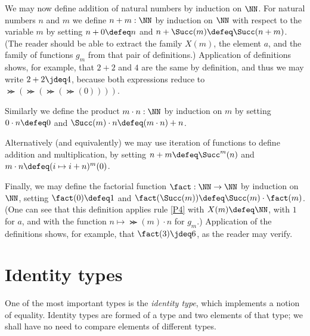 We may now define addition of natural numbers by induction on $\NN$.  For natural numbers $n$ and $m$ we define $n+m : \NN$ by induction on
$\NN$ with respect to the variable $m$ by setting $n+0\defeq n$ and $n+\Succ(m)\defeq \Succ(n+m)$.  (The reader should be able to extract the
family $X(m)$, the element $a$, and the family of functions $g_m$ from that pair of definitions.)  Application of definitions shows, for
example, that $2+2$ and $4$ are the same by definition, and thus we may write $2+2 \jdeq 4$, because both expressions reduce to
$\Succ(\Succ(\Succ(\Succ(0))))$.

Similarly we define the product $m \cdot n : \NN$ by induction on $m$ by setting $ 0 \cdot n \defeq 0$ and
$ \Succ(m) \cdot n \defeq (m \cdot n) + n$.

Alternatively (and equivalently) we may use iteration of functions to define addition and multiplication, by setting $n+m \defeq \Succ^m(n)$ and
$m \cdot n \defeq ( i \mapsto i + n )^m (0) $.

Finally, we may define the factorial function%
$\fact : \NN \to \NN$ by induction on $\NN$, setting $\fact(0) \defeq 1$ and
$\fact(\Succ(m)) \defeq \Succ(m) \cdot \fact(m)$.  (One can see that this definition applies rule \ref{P4} with $X(m) \defeq \NN$, with $1$ for
$a$, and with the function $n \mapsto \Succ(m) \cdot n$ for $g_m$.)  Application of the definitions shows, for example, that $\fact(3) \jdeq 6$, as
the reader may verify.

\section{Identity types}
\label{sec:identity-types}

One of the most important types is the \emph{identity type},
which implements a notion of equality.
Identity types are formed of a type and two elements of that type;
we shall have no need to compare elements of different types.

